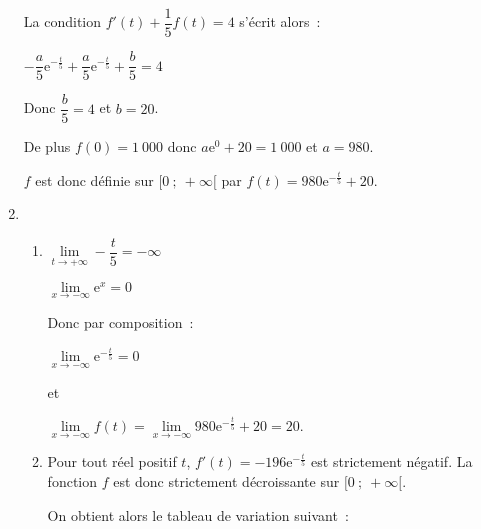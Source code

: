 \begin{corrige}
\begin{enumerate}
          La condition $f'(t)+\dfrac{1}{5}f(t)=4$ s'écrit alors~:
          \par
          $-\dfrac{a}{5}\text{e}^{-\frac{t}{5}} + \dfrac{a}{5}\text{e}^{-\frac{t}{5}} + \dfrac{b}{5} = 4$
          \par
          Donc  $ \dfrac{b}{5} = 4$ et $b=20$.
          \par
          De plus $f(0) = 1~000$ donc $a\text{e}^0+20=1~000$ et $a=980$.
          \par
          $f$ est donc définie sur $[0~;~+\infty[$ par $f(t)=980\text{e}^{-\frac{t}{5}} + 20$.
          \item
          \begin{enumerate}[label=\alph*.]
               \item
               $\lim\limits_{t \rightarrow +\infty}-\dfrac{t}{5} = -\infty$\\
               \par
               $\lim\limits_{x \rightarrow -\infty}\text{e}^{x} = 0$\\
               \par
               Donc par composition~:\\
               \par
               $\lim\limits_{x \rightarrow -\infty}\text{e}^{-\frac{t}{5}} = 0$\\
               \par
               et\\
               \par
               $\lim\limits_{x \rightarrow -\infty}f(t) = \lim\limits_{x \rightarrow -\infty}980\text{e}^{-\frac{t}{5}} + 20 = 20.$\\
               \item
               Pour tout réel positif $t$, $f'(t)=-196\text{e}^{-\frac{t}{5}}$ est strictement négatif. La fonction $f$ est donc strictement décroissante sur $[0~;~+\infty[$.\\
               \par
               On obtient alors le tableau de variation suivant~:
               \begin{center}
                    \begin{extern}%
\end{extern}
\end{center}
\end{enumerate}
\end{enumerate}
\end{corrige}
